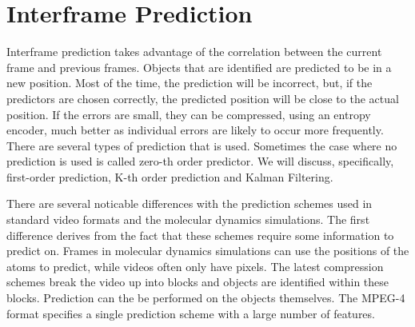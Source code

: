 \documentclass[a4paper,11pt]{report}
\begin{document}
% 
% 

\section{Interframe Prediction} 
\label{back_inter}

Interframe prediction takes advantage of the correlation between the current frame and previous frames. Objects that are identified are predicted to be in a new position. Most of the time, the prediction will be incorrect, but, if the predictors are chosen correctly, the predicted position will be close to the actual position. If the errors are small, they can be compressed, using an entropy encoder, much better as individual errors are likely to occur more frequently. There are several types of prediction that is used. Sometimes the case where no prediction is used is called zero-th order predictor. We will discuss, specifically, first-order prediction, K-th order prediction and Kalman Filtering.

There are several noticable differences with the prediction schemes used in standard video formats and the molecular dynamics simulations. The first difference derives from the fact that these schemes require some information to predict on. Frames in molecular dynamics simulations can use the positions of the atoms to predict, while videos often only have pixels. The latest compression schemes break the video up into blocks and objects are identified within these blocks. Prediction can the be performed on the objects themselves. The MPEG-4 format specifies a single prediction scheme with a large number of features\cite{wiegand2003oha}. 
\end{document}
